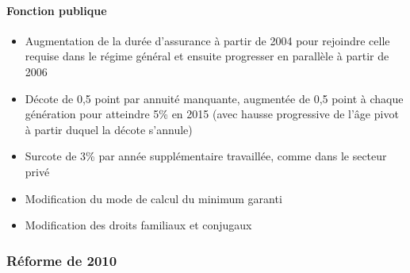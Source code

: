 \paragraph{Fonction publique}

\begin{itemize}
	\item	Augmentation de la durée d'assurance à partir de 2004 pour rejoindre celle requise dans le régime général et ensuite progresser en 
         parallèle à partir de 2006
	\item	Décote de 0,5 point par annuité manquante, augmentée de 0,5 point à chaque génération pour atteindre 5\% en 2015 (avec hausse 
         progressive de l'âge pivot à partir duquel la décote s'annule)
	\item	Surcote de 3\% par année supplémentaire travaillée, comme dans le secteur privé
	\item	Modification du mode de calcul du minimum garanti
	\item	Modification des droits familiaux et conjugaux
\end{itemize}



\subsubsection{Réforme de 2010}

